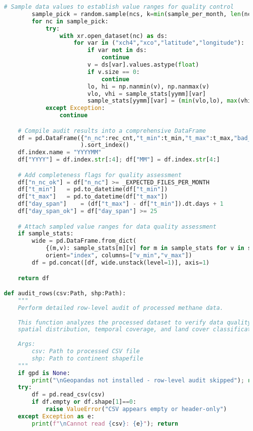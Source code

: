 \begin{lstlisting}[language=Python, caption=Dataset Health Check Algorithm, label=alg:step05_health_check, breaklines=true]
        # Sample data values to establish value ranges for quality control
        sample_pick = random.sample(ncs, k=min(sample_per_month, len(ncs)))
        for nc in sample_pick:
            try:
                with xr.open_dataset(nc) as ds:
                    for var in ("xch4","xco","latitude","longitude"):
                        if var not in ds:
                            continue
                        v = ds[var].values.astype(float)
                        if v.size == 0:
                            continue
                        lo, hi = np.nanmin(v), np.nanmax(v)
                        vlo, vhi = sample_stats[yymm][var]
                        sample_stats[yymm][var] = (min(vlo,lo), max(vhi,hi))
            except Exception:
                continue

    # Compile audit results into a comprehensive DataFrame
    df = pd.DataFrame({"n_nc":rec_cnt,"t_min":t_min,"t_max":t_max,"bad_ts":bad_ts}
                      ).sort_index()
    df.index.name = "YYYYMM"
    df["YYYY"] = df.index.str[:4]; df["MM"] = df.index.str[4:]

    # Add completeness flags for quality assessment
    df["n_nc_ok"] = df["n_nc"] >= _EXPECTED_FILES_PER_MONTH
    df["t_min"]   = pd.to_datetime(df["t_min"])
    df["t_max"]   = pd.to_datetime(df["t_max"])
    df["day_span"]    = (df["t_max"] - df["t_min"]).dt.days + 1
    df["day_span_ok"] = df["day_span"] >= 25

    # Attach sampled value ranges for data quality assessment
    if sample_stats:
        wide = pd.DataFrame.from_dict(
            {(m,v): sample_stats[m][v] for m in sample_stats for v in sample_stats[m]},
            orient="index", columns=["v_min","v_max"])
        df = pd.concat([df, wide.unstack(level=1)], axis=1)

    return df

def audit_rows(csv:Path, shp:Path):
    """
    Perform detailed row-level audit of processed methane data.
    
    This function analyzes the processed dataset to verify data quality,
    spatial distribution, temporal coverage, and land cover classification.
    
    Args:
        csv: Path to processed CSV file
        shp: Path to continent shapefile
    """
    if gpd is None:
        print("\nGeopandas not installed - row-level audit skipped"); return
    try:
        df = pd.read_csv(csv)
        if df.empty or df.shape[1]==0:
            raise ValueError("CSV appears empty or header-only")
    except Exception as e:
        print(f"\nCannot read {csv}: {e}"); return


\end{lstlisting}
